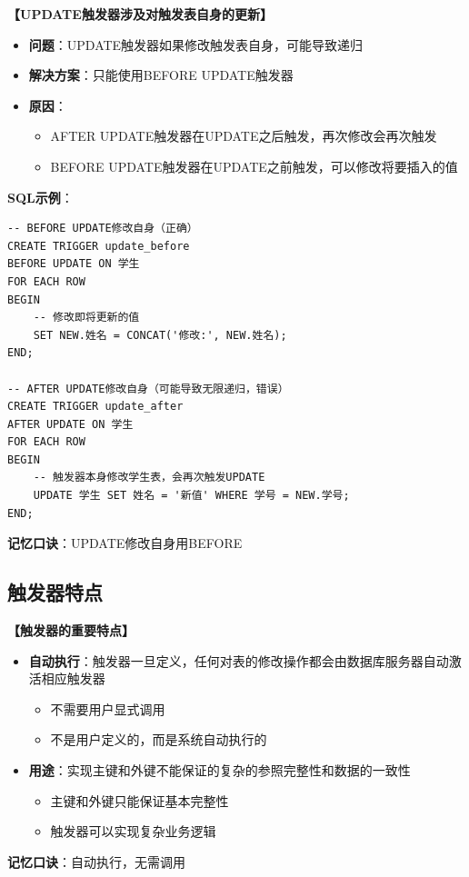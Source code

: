 \documentclass[12pt, a4paper]{article}
\newenvironment{bluebox}[1]{%
  \begin{trivlist}
  \item[\hskip\labelsep \textbf{#1}]
  \setlength{\parskip}{0.5ex}
  \setlength{\itemsep}{0.5ex}
}{%
  \end{trivlist}
  }
\begin{document}
\begin{bluebox}{UPDATE触发器特殊情形}
	\textbf{【UPDATE触发器涉及对触发表自身的更新】}

	\begin{itemize}[leftmargin=*, nosep]
		\item \textbf{问题}：UPDATE触发器如果修改触发表自身，可能导致递归
		\item \textbf{解决方案}：只能使用BEFORE UPDATE触发器
		\item \textbf{原因}：
		      \begin{itemize}[nosep]
			      \item AFTER UPDATE触发器在UPDATE之后触发，再次修改会再次触发
			      \item BEFORE UPDATE触发器在UPDATE之前触发，可以修改将要插入的值
		      \end{itemize}
	\end{itemize}

	\textbf{SQL示例}：
	\begin{verbatim}
-- BEFORE UPDATE修改自身（正确）
CREATE TRIGGER update_before
BEFORE UPDATE ON 学生
FOR EACH ROW
BEGIN
    -- 修改即将更新的值
    SET NEW.姓名 = CONCAT('修改:', NEW.姓名);
END;

-- AFTER UPDATE修改自身（可能导致无限递归，错误）
CREATE TRIGGER update_after
AFTER UPDATE ON 学生
FOR EACH ROW
BEGIN
    -- 触发器本身修改学生表，会再次触发UPDATE
    UPDATE 学生 SET 姓名 = '新值' WHERE 学号 = NEW.学号;
END;
	\end{verbatim}

	\textbf{记忆口诀}：UPDATE修改自身用BEFORE
\end{bluebox}

\subsection{触发器特点}

\begin{bluebox}{触发器特点}
	\textbf{【触发器的重要特点】}

	\begin{itemize}[leftmargin=*, nosep]
		\item \textbf{自动执行}：触发器一旦定义，任何对表的修改操作都会由数据库服务器自动激活相应触发器
		      \begin{itemize}[nosep]
			      \item 不需要用户显式调用
			      \item 不是用户定义的，而是系统自动执行的
		      \end{itemize}

		\item \textbf{用途}：实现主键和外键不能保证的复杂的参照完整性和数据的一致性
		      \begin{itemize}[nosep]
			      \item 主键和外键只能保证基本完整性
			      \item 触发器可以实现复杂业务逻辑
		      \end{itemize}
	\end{itemize}

	\textbf{记忆口诀}：自动执行，无需调用
\end{bluebox}
\end{document}
